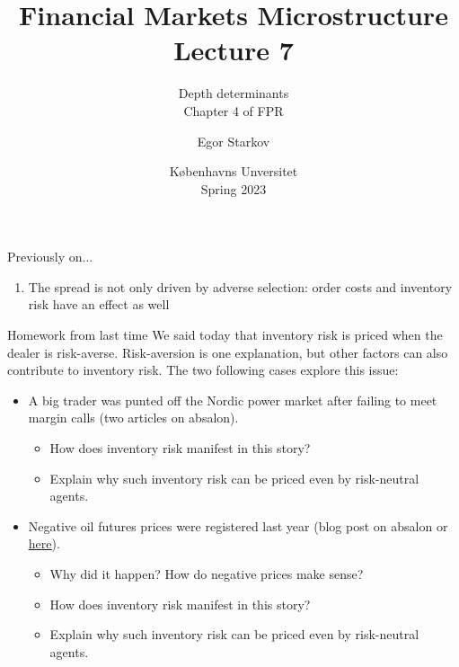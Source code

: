\documentclass[english,10pt
,aspectratio=169
]{beamer}
\title{Financial Markets Microstructure \\ Lecture 7}
\subtitle{Depth determinants \\ %
	Chapter 4 of FPR}
\author{Egor Starkov}
\date{K{\o}benhavns Unversitet \\
	Spring 2023}
\begin{document}
	

\frame[plain]{\titlepage}


\begin{frame}{Previously on...}
	\begin{enumerate}
		\item The spread is not only driven by adverse selection: order costs and inventory risk have an effect as well
	\end{enumerate}
\end{frame}


\begin{frame}{Homework from last time}
	We said today that inventory risk is priced when the dealer is risk-averse. Risk-aversion is one explanation, but other factors can also contribute to inventory risk.
	The two following cases explore this issue:
	\begin{itemize}
		\item A big trader was punted off the Nordic power market after failing to meet margin calls (two articles on absalon).
		\begin{itemize}
			\item How does inventory risk manifest in this story?
			\item Explain why such inventory risk can be priced even by risk-neutral agents.
		\end{itemize}
		\item Negative oil futures prices were registered last year (blog post on absalon or \href{https://streetwiseprofessor.com/wti-wtf/}{\uline{here}}).
		\begin{itemize}
			\item Why did it happen? How do negative prices make sense?
			\item How does inventory risk manifest in this story?
			\item Explain why such inventory risk can be priced even by risk-neutral agents.
		\end{itemize}
	\end{itemize}
\end{frame}
\end{document}
